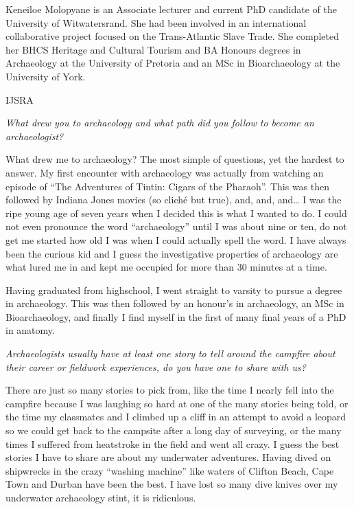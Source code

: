 \IJSRAseparator
{}
{\sffamily Keneiloe Molopyane is an Associate lecturer and current PhD candidate of the University of Witwatersrand. She had been involved in an international collaborative project focused on the Trans-Atlantic Slave Trade. She completed her BHCS Heritage and Cultural Tourism and BA Honours degrees in Archaeology at the University of Pretoria and an MSc in Bioarchaeology at the University of York.}
\begin{labeling}{IJSRA}	
\item[IJSRA (International Journal of Student Research in Archaeology)] \emph{What drew you to archaeology and what path did you follow to become an archaeologist?}
	
\item[Keneiloe Molopyane (KM)]
What drew me to archaeology? The most simple of questions, yet the hardest to answer. My first encounter with archaeology was actually from watching an episode of “The Adventures of Tintin: Cigars of the Pharaoh”. This was then followed by Indiana Jones movies (so cliché but true), and, and, and… I was the ripe young age of seven years when I decided this is what I wanted to do. I could not even pronounce the word “archaeology” until I was about nine or ten, do not get me started how old I was when I could actually spell the word. I have always been the curious kid and I guess the investigative properties of archaeology are what lured me in and kept me occupied for more than 30 minutes at a time.

Having graduated from highschool, I went straight to varsity to pursue a degree in archaeology. This was then followed by an honour’s in archaeology, an MSc in Bioarchaeology, and finally I find myself in the first of many final years of a PhD in anatomy.


\item[IJSRA] \emph{Archaeologists usually have at least one story to tell around the campfire about their career or fieldwork experiences, do you have one to share with us?}
	
\item[KM]
There are just so many stories to pick from, like the time I nearly fell into the campfire because I was laughing so hard at one of the many stories being told, or the time my classmates and I climbed up a cliff in an attempt to avoid a leopard so we could get back to the campsite after a long day of surveying, or the many times I suffered from heatstroke in the field and went all crazy. I guess the best stories I have to share are about my underwater adventures. Having dived on shipwrecks in the crazy “washing machine” like waters of Clifton Beach, Cape Town and Durban have been the best. I have lost so many dive knives over my underwater archaeology stint, it is ridiculous.



\end{labeling}
